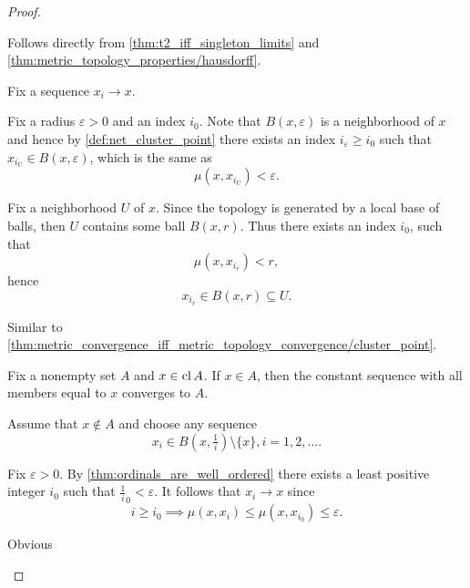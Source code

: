 \begin{proof}
  \begin{description}
     Follows directly from \cref{thm:t2_iff_singleton_limits} and \cref{thm:metric_topology_properties/hausdorff}.

     Fix a sequence \( x_i \to x \).

    \begin{description}
      \Implies Fix a radius \( \varepsilon > 0 \) and an index \( i_0 \). Note that \( B(x, \varepsilon) \) is a neighborhood of \( x \) and hence by \cref{def:net_cluster_point} there exists an index \( i_\varepsilon \geq i_0 \) such that \( x_{i_U} \in B(x, \varepsilon) \), which is the same as
      \begin{equation*}
        \mu(x, x_{i_U}) < \varepsilon.
      \end{equation*}

      \ImpliedBy Fix a neighborhood \( U \) of \( x \). Since the topology is generated by a local base of balls, then \( U \) contains some ball \( B(x, r) \). Thus there exists an index \( i_0 \), such that
      \begin{equation*}
        \mu(x, x_{i_r}) < r,
      \end{equation*}
      hence
      \begin{equation*}
        x_{i_r} \in B(x, r) \subseteq U.
      \end{equation*}
    \end{description}

     Similar to \ref{thm:metric_convergence_iff_metric_topology_convergence/cluster_point}.

    \begin{description}
      \Implies Fix a nonempty set \( A \) and \( x \in \operatorname{cl} A \). If \( x \in A \), then the constant sequence with all members equal to \( x \) converges to \( A \).

      Assume that \( x \not\in A \) and choose any sequence\AOC
      \begin{equation*}
        x_i \in B(x, \tfrac 1 i) \setminus \{ x \}, i = 1, 2, \ldots.
      \end{equation*}

      Fix \( \varepsilon > 0 \). By \cref{thm:ordinals_are_well_ordered} there exists a least positive integer \( i_0 \) such that \( \tfrac 1 i_0 < \varepsilon \). It follows that \( x_i \to x \) since
      \begin{equation*}
        i \geq i_0 \implies \mu(x, x_i) \leq \mu(x, x_{i_0}) \leq \varepsilon.
      \end{equation*}

      \ImpliedBy Obvious
    \end{description}
  \end{description}
\end{proof}

